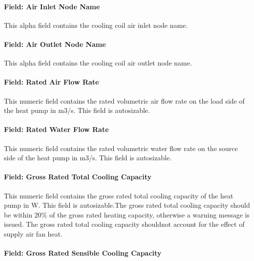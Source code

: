 \paragraph{Field: Air Inlet Node Name}\label{field-air-inlet-node-name-17}

This alpha field contains the cooling coil air inlet node name.

\paragraph{Field: Air Outlet Node Name}\label{field-air-outlet-node-name-17}

This alpha field contains the cooling coil air outlet node name.

\paragraph{Field: Rated Air Flow Rate}\label{field-rated-air-flow-rate-5}

This numeric field contains the rated volumetric air flow rate on the load side of the heat pump in m3/s. This field is autosizable.

\paragraph{Field: Rated Water Flow Rate}\label{field-rated-water-flow-rate}

This numeric field contains the rated volumetric water flow rate on the source side of the heat pump in m3/s. This field is autosizable.

\paragraph{Field: Gross Rated Total Cooling Capacity}\label{field-gross-rated-total-cooling-capacity-3}

This numeric field contains the gross rated total cooling capacity of the heat pump in W. This field is autosizable.The gross rated total cooling capacity should be within 20\% of the gross rated heating capacity, otherwise a warning message is issued. The gross rated total cooling capacity shouldnot account for the effect of supply air fan heat.

\paragraph{Field: Gross Rated Sensible Cooling Capacity}\label{field-gross-rated-sensible-cooling-capacity}

